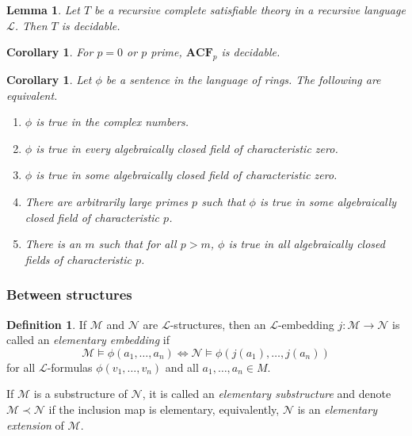\documentclass{amsart}
\newtheorem{lemma}[theorem]{Lemma}
\newtheorem{corollary}[theorem]{Corollary}
\theoremstyle{definition}
\newtheorem{definition}[theorem]{Definition}
\numberwithin{equation}{section}
\begin{document}
\begin{lemma}
    Let $T$ be a recursive complete satisfiable theory in a recursive language $\mathcal{L}$.
    Then $T$ is decidable.
\end{lemma}

\begin{corollary}
    For $p = 0$ or $p$ prime, $\mathbf{ACF}_p$ is decidable.
\end{corollary}

\begin{corollary}
    Let $\phi$ be a sentence in the language of rings.
    The following are equivalent.
    \begin{enumerate}[label = {\roman*)}]
        \item $\phi$ is true in the complex numbers.
        \item $\phi$ is true in every algebraically closed field of characteristic zero.
        \item $\phi$ is true in some algebraically closed field of characteristic zero.
        \item There are arbitrarily large primes $p$ such that $\phi$ is true in some algebraically closed field of characteristic $p$.
        \item There is an $m$ such that for all $p > m$, $\phi$ is true in all algebraically closed fields of characteristic $p$.
    \end{enumerate}
\end{corollary}

\subsubsection{Between structures}
\begin{definition}
    If $\mathcal{M}$ and $\mathcal{N}$ are $\mathcal{L}$-structures,
    then an $\mathcal{L}$-embedding $j: \mathcal{M} \to \mathcal{N}$ is called an \emph{elementary embedding} if
    \[
    \mathcal{M} \models \phi(a_1,\dots,a_n) \iff \mathcal{N} \models \phi(j(a_1),\dots,j(a_n))
    \] 
    for all $\mathcal{L}$-formulas $\phi(v_1,\dots,v_n)$ and all $a_1,\dots,a_n \in M$.

    If $\mathcal{M}$ is a substructure of $\mathcal{N}$, 
    it is called an \emph{elementary substructure} and 
    denote $\mathcal{M} \prec \mathcal{N}$ if the inclusion map is elementary,
    equivalently, $\mathcal{N}$ is an \emph{elementary extension} of $\mathcal{M}$.
\end{definition}
\end{document}

